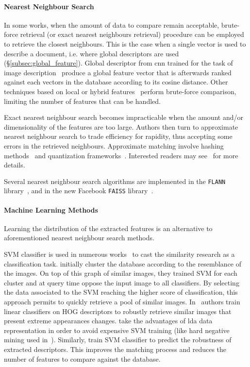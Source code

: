 \paragraph{Nearest Neighbour Search}


In some works, when the amount of data to compare remain acceptable, brute-force retrieval (or exact nearest neighbours retrieval) procedure can be employed to retrieve the closest neighbours. This is the case when a single vector is used to describe a document, i.e. where global descriptors are used (\S\ref{subsec:global_feature}). Global descriptor from \ac{cnn} trained for the task of image description~\citep{Babenko2014,Sunderhauf2015,Radenovic2016,Gordo2016,Arandjelovic2017} produce a global feature vector that is afterwards ranked against each vectors in the database according to its cosine distance. Other techniques based on local or hybrid features~\citep{Zamir2010,Zamir2014,Sunderhauf2015a} perform brute-force comparison, limiting the number of features that can be handled.

Exact nearest neighbour search becomes impracticable when the amount and/or dimensionality of the features are too large. Authors then turn to approximate nearest neighbour search to trade efficiency for rapidity, thus accepting some errors in the retrieved neighbours. Approximate matching involve hashing methods~\citep{Gionis1999} and quantization frameworks~\citep{Nister2006,Philbin2007,Jegou2011}. Interested readers may see~\citep{Wang2017} for more details.

Several nearest neighbour search algorithms are implemented in the \texttt{FLANN} library~\citep{Muja2009}, and in the new Facebook \texttt{FAISS} library~\citep{Johnson2017}. 

\paragraph{Machine Learning Methods}
Learning the distribution of the extracted features is an alternative to aforementioned nearest neighbour search methods.

SVM classifier is used in numerous works~\citep{Shrivastava2011,Cao2013,McManus2014,Aubry2014} to cast the similarity research as a classification task. \citet{Cao2013} initially cluster the database according to the resemblance of the images. On top of this graph of similar images, they trained SVM for each cluster and at query time oppose the input image to all classifiers. By selecting the data associated to the SVM reaching the higher score of classification, this approach permits to quickly retrieve a pool of similar images. In~\citep{McManus2014,Aubry2014} authors train linear classifiers on HOG descriptors to robustly retrieve similar images that present extreme appearances changes. \citet{Aubry2014} take the advantages of \ac{lda} data representation in order to avoid expensive SVM training (like hard negative mining used in~\citep{Shrivastava2011,Kim2015}). Similarly, \citet{Kim2015} train SVM classifier to predict the robustness of extracted descriptors. This improves the matching process and reduces the number of features to compare against the database. 

